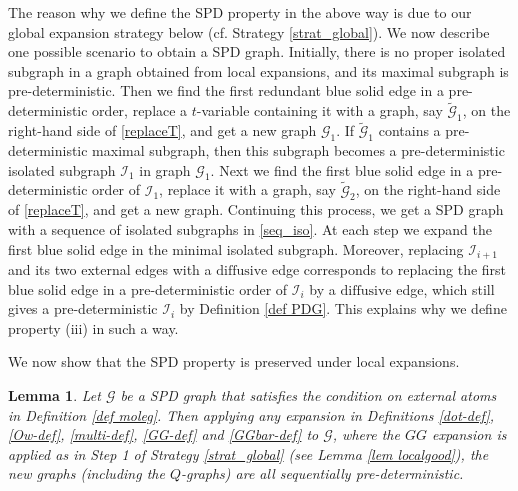\documentclass{article}
\newcommand{\1}{\mathds{1}}
\numberwithin{equation}{section}
\renewcommand{\cal}{\mathcal}
\newcommand{\wt}{\widetilde}
\renewcommand{\leq}{\leqslant}
\renewcommand{\le}{\leq}
\newcommand{\dashed}{\text{diffusive}}
\theoremstyle{plain} %
\newtheorem{lemma}[theorem]{Lemma}
\theoremstyle{remark}
\newtheorem{remark}[theorem]{Remark}
\newcommand{\Iso}{{\mathcal I}}
\begin{document}
The reason why we define the SPD property in the above way is due to our global expansion strategy below (cf. Strategy \ref{strat_global}). We now describe one possible scenario to obtain a SPD graph. Initially, there is no proper isolated subgraph in a graph obtained from  local expansions, and its maximal subgraph is pre-deterministic. Then we find the first redundant blue solid edge in a pre-deterministic order, replace a $t$-variable containing it with a graph, say $\wt{\cal G}_1$, on the right-hand side of \eqref{replaceT}, and get a new graph $\cal G_1$. If $\wt{\cal G}_1$ contains a pre-deterministic maximal subgraph, then this subgraph becomes a pre-deterministic isolated subgraph $\Iso_1$ in graph $\cal G_1$. Next we find the first blue solid edge in a pre-deterministic order of $\Iso_1$, replace it with a graph, say $\wt{\cal G}_2$, on the right-hand side of \eqref{replaceT}, and get a new graph. Continuing this process, we get a SPD graph with a sequence of isolated subgraphs in \eqref{seq_iso}. At each step we expand the first blue solid edge in the minimal isolated subgraph. Moreover, replacing $\Iso_{i+1}$ and its two external edges with a $\dashed$ edge corresponds to replacing the first blue solid edge in a pre-deterministic order of $\Iso_{i}$ by a $\dashed$ edge, which still gives a pre-deterministic $\Iso_i$ by Definition \ref{def PDG}. This explains why we define property (iii) in such a way. 




We now show that the SPD property is preserved under local expansions. 

 
\begin{lemma}\label{lem localgood2}
Let $\cal G$ be a SPD graph that satisfies the condition on external atoms in Definition \ref{def moleg}. Then applying any expansion in Definitions \ref{dot-def}, \ref{Ow-def}, \ref{multi-def}, \ref{GG-def} and \ref{GGbar-def} to $\cal G$, where the $GG$ expansion is applied as in Step 1 of Strategy \ref{strat_global} (see Lemma \ref{lem localgood}), the new graphs (including the $Q$-graphs) are all sequentially pre-deterministic.
 \end{lemma}
 
\end{document}
